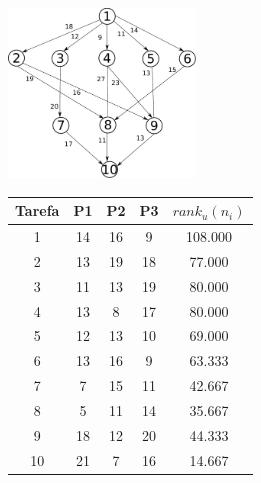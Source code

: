 \documentclass{beamer}
\begin{document}
\begin{frame}
\begin{columns}[c] %
	\begin{column}[c]{.6\textwidth} %
		\includegraphics[height=4.5cm]{dag_heft.pdf}
		
		\begin{table}[ht]
		\tiny
		\centering
		\begin{tabular}{|c|c|c|c|c|}
		\hline
		\textbf{Tarefa} & \textbf{P1} & \textbf{P2} & \textbf{P3} & $rank_u(n_i)$ \\ \hline
		1               & 14          & 16          & 9           & 108.000       \\
		2               & 13          & 19          & 18          & 77.000        \\
		3               & 11          & 13          & 19          & 80.000        \\
		4               & 13          & 8           & 17          & 80.000        \\
		5               & 12          & 13          & 10          & 69.000        \\
		6               & 13          & 16          & 9           & 63.333        \\
		7               & 7           & 15          & 11          & 42.667        \\
		8               & 5           & 11          & 14          & 35.667        \\
		9               & 18          & 12          & 20          & 44.333        \\
		10              & 21          & 7           & 16          & 14.667        \\ \hline
		\end{tabular}
		\end{table}
	\end{column}


\end{columns}
\end{frame}
\end{document}
